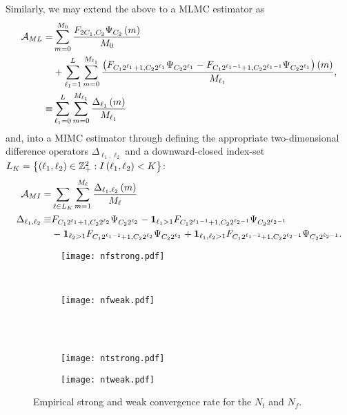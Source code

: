 \documentclass[11pt]{amsart}
\begin{document}
Similarly, we may extend the above to a MLMC estimator as
\begin{align*}
\mathcal{A}_{ML} =& \displaystyle\sum\limits_{m=0}^{M_0} \frac{F_{2 C_1 ,C_2 } \Psi_{C_2 }\left( {m} \right)}{M_0}
\\
&+
\displaystyle\sum\limits_{\ell_1=1}^{L}
\displaystyle\sum\limits_{m=0}^{M_{\ell_1}} \frac{\left( { F_{C_1 2^{\ell_1}+1,C_2 2^{\ell_1}} \Psi_{C_2 2^{\ell_1} } - F_{C_1 2^{\ell_1-1}+1,C_2 2^{\ell_1-1}} \Psi_{C_2 2^{\ell_1} }} \right) \left( {m} \right) }{M_{\ell_1}},
\\
\equiv& \displaystyle\sum\limits_{\ell_1=0}^{L} \displaystyle\sum\limits_{m=0}^{M_{\ell_1}} \frac{\Delta_{\ell_1} \left( {m} \right)}{M_{\ell_1}}
\end{align*}
and, into a MIMC estimator through defining the appropriate two-dimensional difference operators $\Delta_{\ell_1,\ell_2}$ and a downward-closed index-set $L_K=\left\lbrace {\left( {\ell_1,\ell_2} \right)\in \mathbb Z_+^2: I \left( {\ell_1,\ell_2} \right)<K} \right\rbrace$:
\begin{align*}
\mathcal A_{MI} =& \displaystyle\sum\limits_{\ell \in L_K}^{} \displaystyle\sum\limits_{m=1}^{M_{\ell}} \frac{\Delta_{\ell_1,\ell_2} \left( {m} \right)}{M_\ell}
\\
\Delta_{\ell_1,\ell_2}
\equiv&
F_{C_1 2^{\ell_1}+1,C_2 2^{\ell_2}} \Psi_{C_2 2^{\ell_2} } - \mathbf{1}_{\ell_1>1} F_{C_1 2^{\ell_1-1}+1,C_2 2^{\ell_2-1}} \Psi_{C_2 2^{\ell_2-1} }
\\
& -\mathbf{1}_{\ell_2>1} F_{C_1 2^{\ell_1-1}+1,C_2 2^{\ell_2}} \Psi_{C_2 2^{\ell_2} }
+ \mathbf{1}_{\ell_1,\ell_2>1} F_{C_1 2^{\ell_1-1}+1,C_2 2^{\ell_2-1}} \Psi_{C_2 2^{\ell_2-1} }.
\end{align*}



\begin{figure}
    \centering
    \begin{subfigure}[b]{0.4\textwidth}
        \texttt{[image: nfstrong.pdf]}
        \label{fig:gull}
    \end{subfigure}
    ~ %
    \begin{subfigure}[b]{0.4\textwidth}
        \texttt{[image: nfweak.pdf]}
        \label{fig:tiger}
    \end{subfigure}
    \\
    ~ %
    \begin{subfigure}[b]{0.4\textwidth}
        \texttt{[image: ntstrong.pdf]}
        \label{fig:mouse}
    \end{subfigure}
        \begin{subfigure}[b]{0.4\textwidth}
        \texttt{[image: ntweak.pdf]}
        \label{fig:mouse}
    \end{subfigure}
    \caption{\label{fig:empInfDimRates}Empirical strong and weak convergence rate for
    the $N_t$ and $N_f$.}
\end{figure}




\appendix
\end{document}
